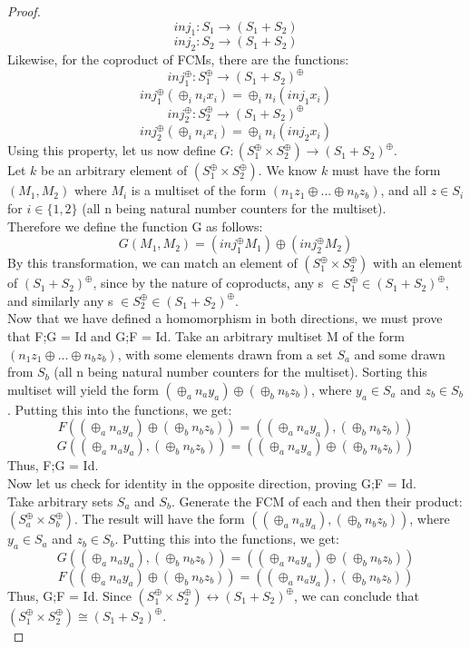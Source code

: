 \begin{lemma}
\begin{proof}
\[inj_1: S_1 \rightarrow (S_1 + S_2) \]
\[inj_2: S_2 \rightarrow (S_1 + S_2)\]
Likewise, for the coproduct of FCMs, there are the functions: \\
\[inj^\oplus_1: S_1^\oplus \rightarrow (S_1 + S_2)^\oplus  \]
\[inj^\oplus_1(\oplus_i n_i x_i) = \oplus_i n_i(inj_1 x_i)\]
\smallskip
\[inj^\oplus_2: S_2^\oplus \rightarrow (S_1 + S_2)^\oplus \]
\[ inj^\oplus_2(\oplus_i n_i x_i) = \oplus_i n_i(inj_2 x_i)\]
Using this property, let us now define $G: (S_1 ^\oplus \times S_2 ^\oplus) \rightarrow (S_1 + S_2)^\oplus$.\\
Let $k$ be an arbitrary element of $(S_1 ^\oplus \times S_2 ^\oplus)$. We know $k$ must have the form $(M_1 , M_2)$ where $M_i$ is a multiset of the form $(n_1z_1 \oplus ... \oplus n_bz_b)$, and all $z \in S_i$ for $i\in\{1, 2\}$ (all n being natural number counters for the multiset).\\
Therefore we define the function G as follows:\\
\[G(M_1, M_2) = (inj_1^\oplus M_1) \oplus (inj_2^\oplus M_2)\]
By this transformation, we can match an element of $(S_1 ^\oplus \times S_2 ^\oplus)$ with an element of $(S_1 + S_2)^\oplus$, since by the nature of coproducts, any s $\in S_1^\oplus \in (S_1+S_2)^\oplus$, and similarly any s $\in S_2^\oplus \in (S_1+S_2)^\oplus$.\bigskip \\
Now that we have defined a homomorphism in both directions, we must prove that F;G = Id and G;F = Id. Take an arbitrary multiset M of the form $(n_1z_1 \oplus ... \oplus n_bz_b)$, with some elements drawn from a set $S_a$ and some drawn from $S_b$ (all n being natural number counters for the multiset). Sorting this multiset will yield the form $(\oplus_a n_a y_a) \oplus (\oplus_b n_b z_b)$, where $y_a \in S_a$ and $z_b \in S_b$. Putting this into the functions, we get:\\ 
\[F((\oplus_a n_a y_a) \oplus (\oplus_b n_b z_b)) = ((\oplus_a n_a y_a), (\oplus_b n_b z_b))\]
\[G((\oplus_a n_a y_a), (\oplus_b n_b z_b)) = ((\oplus_a n_a y_a) \oplus (\oplus_b n_b z_b))\] 
Thus, F;G = Id.\\
Now let us check for identity in the opposite direction, proving G;F = Id.\\
Take arbitrary sets $S_a$ and $S_b$. Generate the FCM of each and then their product: $(S_a^\oplus \times S_b^\oplus)$. The result will have the form $((\oplus_a n_a y_a), (\oplus_b n_b z_b))$, where $y_a \in S_a$ and $z_b \in S_b$. Putting this into the functions, we get:\\ 
\[G((\oplus_a n_a y_a), (\oplus_b n_b z_b)) = ((\oplus_a n_a y_a) \oplus (\oplus_b n_b z_b))\] 
\[F((\oplus_a n_a y_a) \oplus (\oplus_b n_b z_b)) = ((\oplus_a n_a y_a), (\oplus_b n_b z_b))\]
Thus, G;F = Id. 
Since $(S_1 ^\oplus \times S_2 ^\oplus) \leftrightarrow (S_1 + S_2)^\oplus$, we can conclude that $(S_1 ^\oplus \times S_2 ^\oplus) \cong (S_1 + S_2)^\oplus$.\\
\end{proof}
%
\end{lemma}
